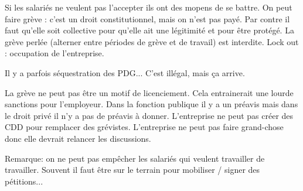 Si les salariés ne veulent pas l'accepter ils ont des mopens de se battre.
On peut faire grève : c'est un droit constitutionnel, mais on n'est pas payé.
Par contre il faut qu'elle soit collective pour qu'elle ait une légitimité et pour être protégé.
La grève perlée (alterner entre périodes de grève et de travail) est interdite.
Lock out : occupation de l'entreprise.

Il y a parfois séquestration des PDG...
C'est illégal, mais ça arrive.

La grève ne peut pas être un motif de licenciement.
Cela entrainerait une lourde sanctions pour l'employeur.
Dans la fonction publique il y a un préavis mais dans le droit privé il n'y a pas de préavis à donner.
L'entreprise ne peut pas créer des CDD pour remplacer des grévistes.
L'entreprise ne peut pas faire grand-chose donc elle devrait relancer les discussions.

Remarque: on ne peut pas empêcher les salariés qui veulent travailler de travailler.
Souvent il faut être sur le terrain pour mobiliser / signer des pétitions... 